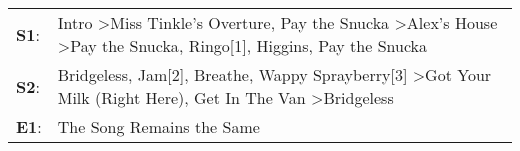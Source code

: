 \begin{supertabular}{p{0.03\textwidth}p{0.92\textwidth}}
 \textbf{S1}:  &  Intro\textsuperscript{} \textgreater \enspace Miss Tinkle's Overture\textsuperscript{}, \enspace Pay the Snucka\textsuperscript{} \textgreater \enspace Alex's House\textsuperscript{} \textgreater \enspace Pay the Snucka\textsuperscript{}, \enspace Ringo[1]\textsuperscript{}, \enspace Higgins\textsuperscript{}, \enspace Pay the Snucka\textsuperscript{}  \enspace  \\
 \textbf{S2}:  &                                               Bridgeless\textsuperscript{}, \enspace Jam[2]\textsuperscript{}, \enspace Breathe\textsuperscript{}, \enspace Wappy Sprayberry[3]\textsuperscript{} \textgreater \enspace Got Your Milk (Right Here)\textsuperscript{}, \enspace Get In The Van\textsuperscript{} \textgreater \enspace Bridgeless\textsuperscript{}  \enspace  \\
 \textbf{E1}:  &                                                                                                                                                                                                                                                                                                                        The Song Remains the Same\textsuperscript{}  \enspace  \\
\end{supertabular}
